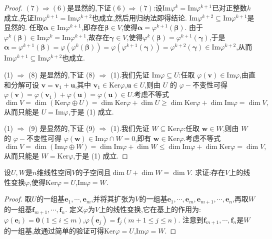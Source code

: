 \documentclass[../../main.tex]{subfiles}%
\begin{document}
\begin{proof}
\((7)\Rightarrow(6)\)是显然的,下证\((6)\Rightarrow(7)\):设\(\text{Im}\varphi^k=\text{Im}\varphi^{k + 1}\)已对正整数\(k\)成立,先证\(\text{Im}\varphi^{k + 1}=\text{Im}\varphi^{k + 2}\)也成立,然后用归纳法即得结论. \(\text{Im}\varphi^{k + 2}\subseteq\text{Im}\varphi^{k + 1}\)是显然的. 任取\(\boldsymbol{\alpha}\in\text{Im}\varphi^{k + 1}\),即存在\(\boldsymbol{\beta}\in V\),使得\(\boldsymbol{\alpha}=\varphi^{k + 1}(\boldsymbol{\beta})\). 由于\(\varphi^k(\boldsymbol{\beta})\in\text{Im}\varphi^k=\text{Im}\varphi^{k + 1}\),故存在\(\boldsymbol{\gamma}\in V\),使得\(\varphi^k(\boldsymbol{\beta})=\varphi^{k + 1}(\boldsymbol{\gamma})\),于是\(\boldsymbol{\alpha}=\varphi^{k + 1}(\boldsymbol{\beta})=\varphi(\varphi^k(\boldsymbol{\beta}))=\varphi(\varphi^{k + 1}(\boldsymbol{\gamma}))=\varphi^{k + 2}(\boldsymbol{\gamma})\in\text{Im}\varphi^{k + 2}\),从而\(\text{Im}\varphi^{k + 1}\subseteq\text{Im}\varphi^{k + 2}\)也成立.

(1) \(\Rightarrow\) (8) 是显然的,下证 (8) \(\Rightarrow\) (1).我们先证 \(\text{Im}\varphi\subseteq U\):任取 \(\varphi(\boldsymbol{v})\in\text{Im}\varphi\),由直和分解可设 \(\boldsymbol{v}=\boldsymbol{v}_1+\boldsymbol{u}\),其中 \(\boldsymbol{v}_1\in\text{Ker}\varphi\),\(\boldsymbol{u}\in U\),则由 \(U\) 的 \(\varphi -\)不变性可得 \(\varphi(\boldsymbol{v})=\varphi(\boldsymbol{v}_1)+\varphi(\boldsymbol{u})=\varphi(\boldsymbol{u})\in U\).考虑不等式
\[
\dim V=\dim(\text{Ker}\varphi\oplus U)=\dim\text{Ker}\varphi+\dim U\geqslant \dim\text{Ker}\varphi+\dim\text{Im}\varphi=\dim V,
\]
从而只能是 \(U = \text{Im}\varphi\),于是 (1) 成立.

(1) \(\Rightarrow\) (9) 是显然的,下证 (9) \(\Rightarrow\) (1).我们先证 \(W\subseteq\text{Ker}\varphi\):任取 \(\boldsymbol{w}\in W\),则由 \(W\) 的 \(\varphi -\)不变性可得 \(\varphi(\boldsymbol{w})\in\text{Im}\varphi\cap W = 0\),即有 \(\boldsymbol{w}\in\text{Ker}\varphi\).考虑不等式
\[
\dim V=\dim(\text{Im}\varphi\oplus W)=\dim\text{Im}\varphi+\dim W\leqslant \dim\text{Im}\varphi+\dim\text{Ker}\varphi=\dim V,
\]
从而只能是 \(W = \text{Ker}\varphi\),于是 (1) 成立.

\end{proof}

\begin{proposition}\label{proposition:由维数公式得到线性映射的存在性}
设\(U,W\)是\(n\)维线性空间\(V\)的子空间且\(\dim U+\dim W=\dim V\). 求证:存在\(V\)上的线性变换\(\varphi\),使得\(\text{Ker}\varphi = U\),\(\text{Im}\varphi = W\).
\end{proposition}
\begin{proof}

取\(U\)的一组基\(\boldsymbol{e}_1,\cdots,\boldsymbol{e}_m\),并将其扩张为\(V\)的一组基\(\boldsymbol{e}_1,\cdots,\boldsymbol{e}_m,\boldsymbol{e}_{m + 1},\cdots,\boldsymbol{e}_n\),再取\(W\)的一组基\(\boldsymbol{f}_{m + 1},\cdots,\boldsymbol{f}_n\). 定义\(\varphi\)为\(V\)上的线性变换,它在基上的作用为:\(\varphi(\boldsymbol{e}_i)=\boldsymbol{0}(1\leqslant  i\leqslant  m)\),\(\varphi(\boldsymbol{e}_j)=\boldsymbol{f}_j(m + 1\leqslant  j\leqslant  n)\). 注意到\(\boldsymbol{f}_{m + 1},\cdots,\boldsymbol{f}_n\)是\(W\)的一组基,故通过简单的验证可得\(\text{Ker}\varphi = U\),\(\text{Im}\varphi = W\). 

\end{proof}
\end{document}
